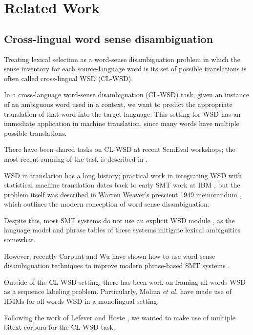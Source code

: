 \section{Related Work}

\subsection{Cross-lingual word sense disambiguation}
Treating lexical selection as a word-sense disambiguation problem in which the
sense inventory for each source-language word is its set of possible
translations is often called cross-lingual WSD (CL-WSD).

In a cross-language word-sense disambiguation (CL-WSD) task, given an
instance of an ambiguous word used in a context, we want to predict the
appropriate translation of that word into the target language. This setting for
WSD has an immediate application in machine translation, since many words have
multiple possible translations.

There have been shared tasks on CL-WSD at recent SemEval workshops; the most
recent running of the task is described in \cite{task10}.

WSD in translation has a long history; practical work in integrating
WSD with statistical machine translation dates back to early SMT work at IBM
\cite{Brown91word-sensedisambiguation}, but the problem itself was described in
Warren Weaver's prescient 1949 memorandum \cite{weavermemo}, which outlines the
modern conception of word sense disambiguation.

Despite this, most SMT systems do not use an explicit WSD module
\cite{wsdchap3}, as the language model and phrase tables of these systems
mitigate lexical ambiguities somewhat.


However, recently Carpuat and Wu have shown how to use word-sense
disambiguation techniques to improve modern phrase-based SMT systems
\cite{carpuatpsd}.
\cite{carpuat2008evaluation}
\cite{carpuat-wu:2007:EMNLP-CoNLL2007}


Outside of the CL-WSD setting, there has been work on framing all-words WSD as
a sequence labeling problem. Particularly, Molina \textit{et al.}
 have made use of HMMs for all-words
WSD in a monolingual setting.

Following the work of Lefever and Hoste
, we wanted to make use of
multiple bitext corpora for the CL-WSD task.


